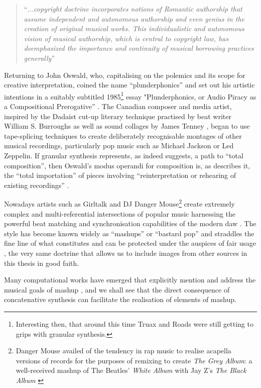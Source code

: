 \blockcquote[]{Arewa1979}{``\textit{...copyright doctrine incorporates notions of Romantic authorship that assume independent and autonomous authorship and even genius in the creation of original musical works. This individualistic and autonomous vision of musical authorship, which is central to copyright law, has deemphasized the importance and continuity of musical borrowing practices generally}''}

Returning to John Oswald, who, capitalising on the polemics and its scope for creative interpretation, coined the name ``plunderphonics'' and set out his artistic intentions in a suitably subtitled 1985\footnote{Interesting then, that around this time Truax and Roads were still getting to grips with granular synthesis.} essay "Plunderphonics, or Audio Piracy as a Compositional Prerogative” \citep{Oswald1985}. The Canadian composer and media artist, inspired by the Dadaist cut-up literary technique practised by beat writer William S. Burroughs as well as sound collages by James Tenney \citep{Cox2004}, began to use tape-splicing techniques to create deliberately recognisable montages of other musical recordings, particularly pop music such as Michael Jackson or Led Zeppelin. If granular synthesis represents, as \cite{Thomson2004} indeed suggests,  a path to ``total composition'', then Oswald's modus operandi for composition is, as \cite{Holm-Hudson1997} describes it, the ``total importation'' of pieces involving ``reinterpretation or rehearing of existing recordings'' \citep{Cutler1994}.

Nowadays artists such as Girltalk and DJ Danger Mouse\footnote{Danger Mouse availed of the tendency in rap music to realise acapella versions of records for the purposes of remixing to create \textit{The Grey Album}: a well-received mashup of The Beatles' \textit{White Album} with Jay Z's \textit{The Black Album} \citep{Gunderson204}}  create extremely complex and multi-referential intersections of popular music harnessing the powerful beat matching and synchronisation capabilities of the modern \acrshort{daw} \citep{Humphrey2013}. The style has become known widely as ``mashups'' or ``bastard pop'' \citep{McGranahan2010} and straddles the fine line of what constitutes and can be protected under the auspices of fair usage \citep{Mongillo2009}, the very same doctrine that allows us to include images from other sources in this thesis in good faith.

Many computational works have emerged that explicitly mention and address the musical goals of mashup \citep{Tokui2008, Davies2013, Davies2014a, Davies2014b, Lee2015, Smith2015, Meroo-Peuela2017}, and we shall see that the direct consequence of concatenative synthesis can facilitate the realisation of elements of mashup.

